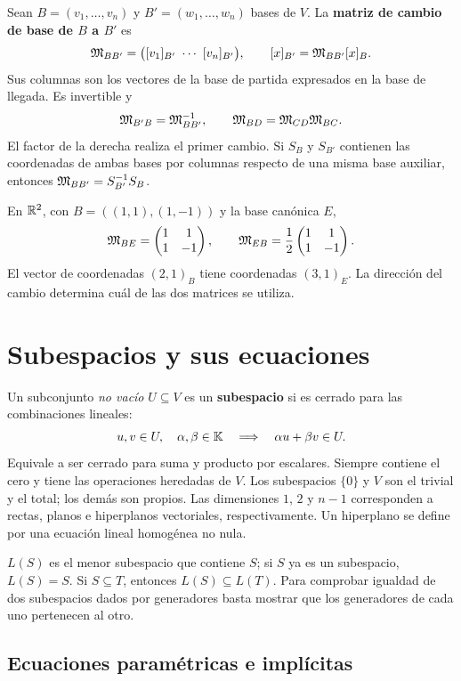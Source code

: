 Sean $B=(v_1,\ldots,v_n)$ y $B'=(w_1,\ldots,w_n)$ bases de $V$.
La \textbf{matriz de cambio de base de $B$ a $B'$} es
\[
 \M_{BB'}=\bigl(\coord{v_1}{B'}\ \cdots\ \coord{v_n}{B'}\bigr),
 \qquad \coord{x}{B'}=\M_{BB'}\coord{x}{B}.
\]
Sus columnas son los vectores de la base de partida expresados en la
base de llegada. Es invertible y
\[
 \mathfrak{M}_{B'B}=\mathfrak{M}_{BB'}^{-1},\qquad
 \mathfrak{M}_{BD}=\mathfrak{M}_{CD}\mathfrak{M}_{BC}.
\]
El factor de la derecha realiza el primer cambio.
Si $S_B$ y $S_{B'}$ contienen las coordenadas de ambas bases por columnas
respecto de una misma base auxiliar, entonces
$\mathfrak{M}_{BB'}=S_{B'}^{-1}S_B$.

\begin{ejemplo}
En $\mathbb{R}^2$, con $B=((1,1),(1,-1))$ y la base canónica $E$,
\[
 \mathfrak{M}_{BE}=\begin{pmatrix}1&1\\1&-1\end{pmatrix},\qquad
 \mathfrak{M}_{EB}=\frac12\begin{pmatrix}1&1\\1&-1\end{pmatrix}.
\]
El vector de coordenadas $(2,1)_B$ tiene coordenadas $(3,1)_E$.
La dirección del cambio determina cuál de las dos matrices se utiliza.
\end{ejemplo}

\section{Subespacios y sus ecuaciones}
\label{sec:ecuaciones-subespacios}

Un subconjunto \emph{no vacío} $U\subseteq V$ es un \textbf{subespacio}
si es cerrado para las combinaciones lineales:
\[
 u,v\in U,\quad\alpha,\beta\in\mathbb{K}
 \quad\Longrightarrow\quad\alpha u+\beta v\in U.
\]
Equivale a ser cerrado para suma y producto por escalares. Siempre contiene
el cero y tiene las operaciones heredadas de $V$. Los subespacios
$\{0\}$ y $V$ son el trivial y el total; los demás son propios.
Las dimensiones $1$, $2$ y $n-1$ corresponden a rectas, planos e hiperplanos
vectoriales, respectivamente. Un hiperplano se define por una ecuación
lineal homogénea no nula.

$L(S)$ es el menor subespacio que contiene $S$; si $S$ ya es un subespacio,
$L(S)=S$. Si $S\subseteq T$, entonces $L(S)\subseteq L(T)$.
Para comprobar igualdad de dos subespacios dados por generadores basta
mostrar que los generadores de cada uno pertenecen al otro.

\subsection*{Ecuaciones paramétricas e implícitas}

